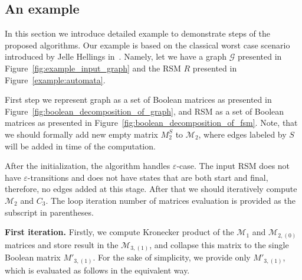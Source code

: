 \subsection{An example}

In this section we introduce detailed example to demonstrate steps of the 
proposed algorithms. Our example is based on the classical worst case scenario 
introduced by Jelle Hellings in~\cite{hellingsPathQuerying}. Namely, let we have 
a graph $\mathcal{G}$ presented in Figure~\ref{fig:example_input_graph} and the 
RSM $R$ presented in Figure~\ref{example:automata}.

First step we represent graph as a set of Boolean matrices as presented in Figure~\ref{fig:boolean_decomposition_of_graph}, and RSM as a set of Boolean matrices as presented in Figure~\ref{fig:boolean_decomposition_of_fsm}.
Note, that we should formally add new empty matrix $M_2^{S}$ to $\mathcal{M}_2$, 
where edges labeled by $S$ will be added in time of the computation. 

After the initialization, the algorithm handles $\varepsilon$-case.
The input RSM does not have $\varepsilon$-transitions and does not have states
that are both start and final, therefore, no edges added at this stage. 
After that we should iteratively compute $\mathcal{M}_2$ and $C_3$.
The loop iteration number of matrices evaluation is provided as 
the subscript in parentheses.

\textbf{First iteration.} Firstly, we compute Kronecker product of the
$\mathcal{M}_1$ and $\mathcal{M}_{2,(0)}$ matrices and store result in the
$\mathcal{M}_{3,(1)}$, and collapse this matrix to the single Boolean matrix
$M'_{3,(1)}$. For the sake of simplicity, we provide only
$M'_{3,(1)}$, which is evaluated as follows in the equivalent way.

